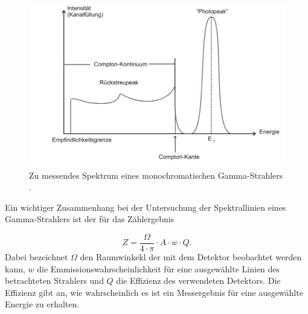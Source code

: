 \FloatBarrier
\begin{figure}
  \includegraphics[width=\textwidth]{content/skizzen/idspektrum.PNG}
  \caption{Zu messendes Spektrum eines monochromatischen Gamma-Strahlers \cite{sample}.}
  \label{fig:idealspektrum}
\end{figure}
\FloatBarrier
Ein wichtiger Zusammenhang bei der Untersuchung der Spektrallinien eines Gamma-Strahlers ist der für
das Zählergebnis

\begin{equation}
  \label{eqn:effizienz}
  Z = \frac{\Omega}{4\cdot \pi} \cdot A \cdot w \cdot Q .
\end{equation}
Dabei bezeichnet $\Omega$ den Raumwinkekl der mit dem Detektor beobachtet werden kann, $w$ die
Emmissionswahrscheinlichkeit für eine ausgewählte Linien des betrachteten Strahlers und $Q$ die
Effizienz des verwendeten Detektors. Die Effizienz gibt an, wie wahrscheinlich es ist ein Messergebnis für eine ausgewählte
Energie zu erhalten.

\cite{sample}